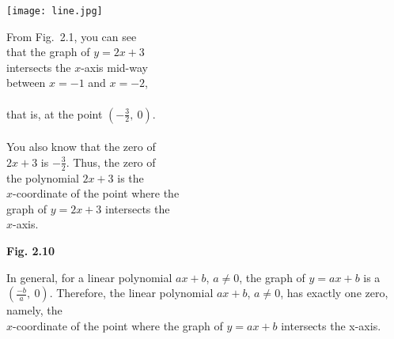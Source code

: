 \documentclass[12pt]{article}
\begin{document}
\begin{flushright}
    \vspace{-9em}\texttt{[image: line.jpg]} 
\end{flushright}
\vspace{-13em}
\hspace{2em}From Fig.~2.1, you can see\\
that the graph of \( y = 2x + 3 \)\\
intersects the \( x \)-axis mid-way\\
between \( x = -1 \) and \( x = -2 \),\\
\\ that is, at the point \( \left( -\frac{3}{2},\ 0 \right) \).\\
\\You also know that the zero of\\
\( 2x + 3 \) is \( -\frac{3}{2} \).
Thus, the zero of
\\the polynomial \( 2x + 3 \) is the\\
\( x \)-coordinate of the point where the\\
graph of \( y = 2x + 3 \) intersects the\\
\( x \)-axis.\\
\vspace{-5.7em}
\begin{center}
{\textcolor{myblue}{\textbf{Fig. 2.10}}}

\end{center}
\hspace{2em}In general, for a linear polynomial \( ax + b \), \( a \neq 0 \), the graph of \( y = ax + b \) is a\\

 $\left( \frac{-b}{a},\ 0 \right).$
Therefore, the linear polynomial \( ax + b \), \( a \neq 0 \), has exactly one zero, namely, the\\
\( x \)-coordinate of the point where the graph of \( y = ax + b \) intersects the x-axis.\\
\end{document}
